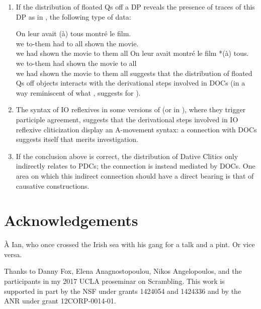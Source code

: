 \documentclass[output=paper]{langsci/langscibook}
\begin{document}
\begin{enumerate}
\item If the distribution of floated Qs off a DP reveals the presence of traces
    of this DP as in  \cite{Sportiche:1988}, the following type of data:

\ea
\ea
	\gll  On leur avait  (\`a) tous montr\'e le film.\\
    we to-them had \hphantom{(}to all shown the movie.\\
    \trans we had shown the movie to them all
\ex
	\gll On leur avait montré le film *(\`a) tous.\\
    we to-them had  shown the movie \hphantom{*(}to all\\
    \trans we had shown the movie to them all
\z
\z
%
suggests that the distribution of floated Qs off objects interacts with the
derivational steps involved in \glspl{DOC} (in a
way reminiscent of what \citealp{Sportiche2017c}, suggests for ).

\item The syntax of IO reflexives in some versions of  (or in ),
    where they trigger participle agreement, suggests that the derivational
    steps involved in IO reflexive cliticization display an A-movement syntax:
    a connection with  \glspl{DOC} suggests itself that merits
    investigation.

\item If the conclusion above is correct, the distribution of  Dative
    Clitics only indirectly relates to \glspl{PDC}; the connection
    is instead mediated by \glspl{DOC}. One area on which this indirect
    connection should have a direct bearing is that of causative constructions.

\end{enumerate}

\printchapterglossary{}

\section*{Acknowledgements}

\`A Ian, who once crossed the Irish sea with his gang for a talk and a pint. Or
vice versa.

Thanks to Danny Fox, Elena Anagnostopoulou, Nikos Angelopoulos, and the
participants in my 2017 UCLA proseminar on Scrambling. This work is supported
in part by the NSF under grants 1424054 and 1424336 and by the ANR under grant
12CORP-0014-01.

{\sloppy
\printbibliography[heading=subbibliography,notkeyword=this]
}
\end{document}
